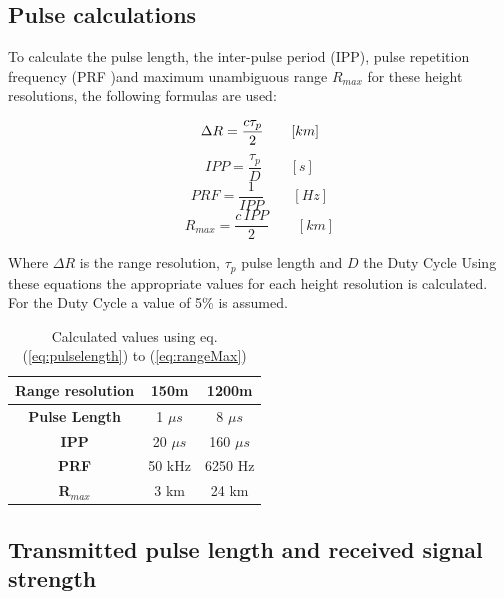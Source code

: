 \subsection{Pulse calculations}
To calculate the pulse length, the inter-pulse period (IPP), pulse repetition frequency (PRF )and maximum unambiguous range 	$R_{max}$ for these height resolutions, the following formulas are used:

\begin{center}
\begin{equation}
\centering
\label{eq:pulselength}
	\Delta R = \frac{c \tau_p }{2} \qquad [km]
\end{equation}
\begin{equation}
\label{eq:ipp}
	{IPP} = \frac{\tau_p }{D} \qquad [s] 
\end{equation}
\begin{equation}
\label{eq:prf}
	PRF = \frac{1}{IPP} \qquad [Hz]
\end{equation}
\begin{equation}
\label{eq:rangeMax}
	R_{max} = \frac{c \,  {IPP} }{2} \qquad [km]
\end{equation}
\end{center}

Where $\Delta R$ is the range resolution, $\tau_p$ pulse length and $D$ the Duty Cycle
Using these equations the appropriate values for each height resolution is calculated. For the Duty Cycle a value of 5\% is assumed.

\begin{center}
\begin{table}
\label{tab:range}
	\caption{Calculated values using eq. (\ref{eq:pulselength}) to (\ref{eq:rangeMax})}
\begin{center}
\begin{tabular}{ |c | c | c|}
	\hline
	\textbf{Range resolution} & \textbf{150m} & \textbf{1200m} \\
	\hline
	\textbf{Pulse Length} & 1 $\mu s$ & 8 $\mu s$ \\
	\textbf{IPP} & 20 $\mu s$  & 160 $\mu s$ \\
	\textbf{PRF} & 50 kHz & 6250 Hz\\
	\textbf{ R$_{max}$} & 3 km & 24 km\\
	\hline	
\end{tabular}
\end{center}
\end{table}
\end{center}


\subsection{Transmitted pulse length and received signal strength}

